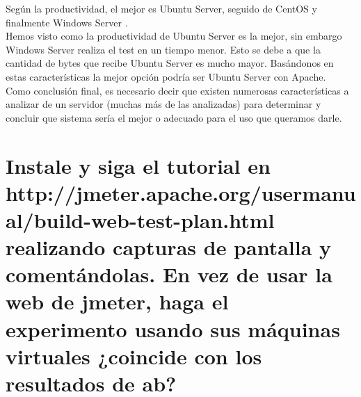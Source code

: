 	Según la productividad, el mejor es Ubuntu Server, seguido de CentOS y finalmente Windows Server .\\
	
	Hemos visto como la productividad de Ubuntu Server es la mejor, sin embargo Windows Server realiza el test en un tiempo menor. Esto se debe a que la cantidad de bytes que recibe Ubuntu Server es mucho mayor. Basándonos en estas características la mejor opción podría ser Ubuntu Server con Apache.\\
	
	Como conclusión final, es necesario decir que existen numerosas características a analizar de un servidor (muchas más de las analizadas) para determinar y concluir que sistema sería el mejor o adecuado para el uso que queramos darle. 
	
	\section{Instale y siga el tutorial en http://jmeter.apache.org/usermanual/build-web-test-plan.html realizando capturas de pantalla y comentándolas. En vez de usar la web de jmeter, haga el experimento usando sus máquinas virtuales ¿coincide con los resultados de ab?}
	
